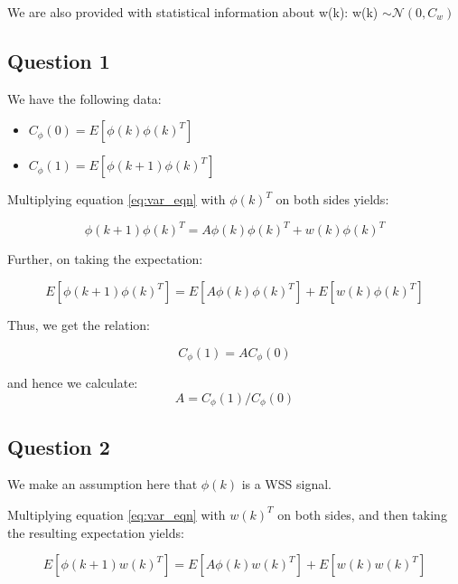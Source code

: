 \documentclass[12pt]{report}
\begin{document}
We are also provided with statistical information about w(k): w(k) $\sim \mathcal{N}(0, C_{w})$

\subsection*{Question 1}

We have the following data:

\begin{itemize}
	\item $C_{\phi}(0) = E\left[\phi(k)\phi(k)^{T}\right]$
	\item $C_{\phi}(1) = E\left[\phi(k+1)\phi(k)^{T}\right]$
\end{itemize}

Multiplying equation \ref{eq:var_eqn} with $\phi(k)^{T}$ on both sides yields:

\begin{equation*}
\phi(k+1)\phi(k)^{T} = A\phi(k)\phi(k)^{T} + w(k)\phi(k)^{T}
\end{equation*}

Further, on taking the expectation:

\begin{equation*}
E\left[\phi(k+1)\phi(k)^{T}\right] = E\left[A\phi(k)\phi(k)^{T}\right] + E\left[w(k)\phi(k)^{T}\right]
\end{equation*}

Thus, we get the relation:

\begin{equation*}
	C_{\phi}(1) = AC_{\phi}(0)
\end{equation*}

and hence we calculate:
\begin{equation*}
	A = C_{\phi}(1)/C_{\phi}(0)
\end{equation*}


\subsection*{Question 2}

We make an assumption here that $\phi(k)$ is a WSS signal.

Multiplying equation \ref{eq:var_eqn} with $w(k)^{T}$ on both sides, and then taking the resulting expectation yields:

\begin{equation*}
E\left[\phi(k+1)w(k)^{T}\right] = E\left[A\phi(k)w(k)^{T}\right] + E\left[w(k)w(k)^{T}\right]
\end{equation*} 
\end{document}
